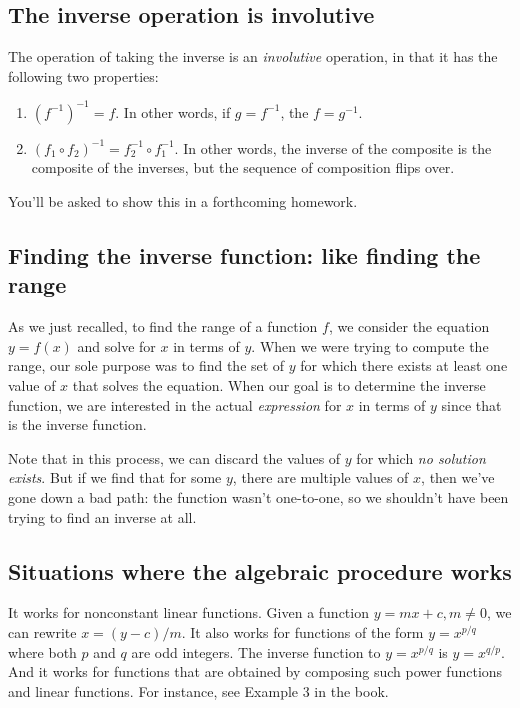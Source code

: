 \documentclass[10pt]{amsart}
\begin{document}
\subsection{The inverse operation is involutive}

The operation of taking the inverse is an {\em involutive} operation, in that it has the following two properties:

\begin{enumerate}
\item $(f^{-1})^{-1} = f$. In other words, if $g = f^{-1}$, the $f =
  g^{-1}$.
\item $(f_1 \circ f_2)^{-1} = f_2^{-1} \circ f_1^{-1}$. In other
  words, the inverse of the composite is the composite of the
  inverses, but the sequence of composition flips over.
\end{enumerate}

You'll be asked to show this in a forthcoming homework.

\subsection{Finding the inverse function: like finding the range}

As we just recalled, to find the range of a function $f$, we consider
the equation $y = f(x)$ and solve for $x$ in terms of $y$. When we
were trying to compute the range, our sole purpose was to find the set
of $y$ for which there exists at least one value of $x$ that solves
the equation. When our goal is to determine the inverse function, we
are interested in the actual {\em expression} for $x$ in terms of $y$
since that is the inverse function.

Note that in this process, we can discard the values of $y$ for which
{\em no solution exists}. But if we find that for some $y$, there are
multiple values of $x$, then we've gone down a bad path: the function
wasn't one-to-one, so we shouldn't have been trying to find an inverse
at all.

\subsection{Situations where the algebraic procedure works}

It works for nonconstant linear functions. Given a function $y = mx +
c, m \ne 0$, we can rewrite $x = (y - c)/m$. It also works for
functions of the form $y = x^{p/q}$ where both $p$ and $q$ are odd
integers. The inverse function to $y = x^{p/q}$ is $y = x^{q/p}$. And
it works for functions that are obtained by composing such power
functions and linear functions. For instance, see Example 3 in the
book.
\end{document}
